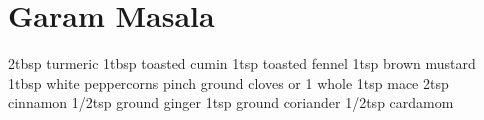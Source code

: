 \section{Garam Masala}

2tbsp turmeric
1tbsp toasted cumin
1tsp toasted fennel
1tsp brown mustard
1tbsp white peppercorns
pinch ground cloves or 1 whole
1tsp mace
2tsp cinnamon
1/2tsp ground ginger
1tsp ground coriander
1/2tsp cardamom
